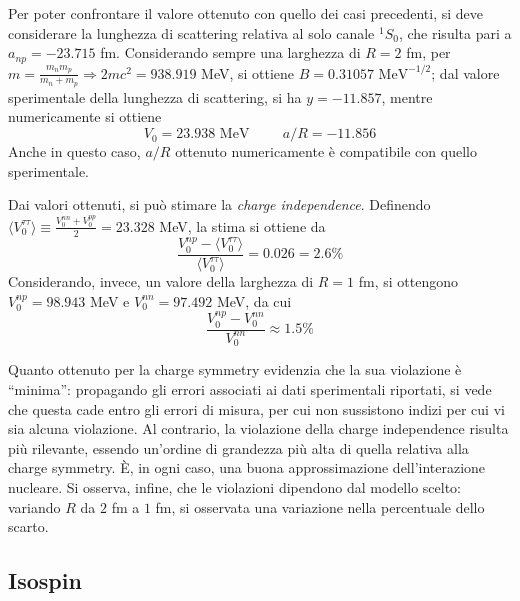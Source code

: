 \documentclass[11pt, a4paper]{scrartcl}
\theoremstyle{style}
\numberwithin{equation}{subsection}
\begin{document}
\begin{itemize}
	Per poter confrontare il valore ottenuto con quello dei casi precedenti, si deve considerare la lunghezza di scattering relativa al solo canale $^{1}S_0$, che risulta pari a $a_{np} = -23.715$ fm.
	Considerando sempre una larghezza di $R = 2$ fm, per $m = \frac{m_n m_p}{ m_n + m_p}\Rightarrow 2mc^2 = 938.919$ MeV, si ottiene $B = 0.31057 \text{ MeV}^{-1 / 2}$; dal valore sperimentale della lunghezza di scattering, si ha $y = -11.857$, mentre numericamente si ottiene 
	\[
	V_0 = 23.938 \text{ MeV} \hspace{1cm} a / R = -11.856
	\] 
	Anche in questo caso, $a/R$ ottenuto numericamente \`e compatibile con quello sperimentale.

	Dai valori ottenuti, si pu\`o stimare la \textit{charge independence}.
	Definendo $\langle V_0^{\tau  \tau } \rangle \equiv \frac{V_0^{nn} + V_0^{pp}}{2} = 23.328$ MeV, la stima si ottiene da
\begin{equation}
	\frac{V_0^{np} - \langle V_0^{\tau \tau } \rangle}{\langle V_0^{\tau \tau } \rangle} = 0.026 = 2.6 \%
\end{equation}	
Considerando, invece, un valore della larghezza di $R = 1 $ fm, si ottengono $V_0^{np} = 98.943$ MeV e $V_0^{nn} = 97.492$ MeV, da cui 
\begin{equation}
	\frac{V_0^{np} - V_0^{nn}}{V_0^{nn}} \approx 1.5 \%
\end{equation}
\end{itemize}
Quanto ottenuto per la charge symmetry evidenzia che la sua violazione \`e ``minima'': propagando gli errori associati ai dati sperimentali riportati, si vede che questa cade entro gli errori di misura, per cui non sussistono indizi per cui vi sia alcuna violazione.
Al contrario, la violazione della charge independence risulta pi\`u rilevante, essendo un'ordine di grandezza pi\`u alta di quella relativa alla charge symmetry.
\`E, in ogni caso, una buona approssimazione dell'interazione nucleare.
Si osserva, infine, che le violazioni dipendono dal modello scelto: variando $R$ da $2$ fm a $1$ fm, si osservata una variazione nella percentuale dello scarto.
\subsection{Isospin}
\end{document}
